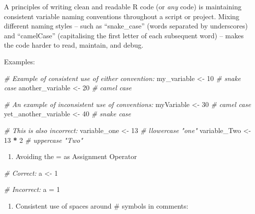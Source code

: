 \documentclass[
  10t,
]{article}
\newenvironment{Shaded}{\begin{snugshade}}{\end{snugshade}}
\newcommand{\CommentTok}[1]{\textcolor[rgb]{0.56,0.35,0.01}{\textit{#1}}}
\newcommand{\DecValTok}[1]{\textcolor[rgb]{0.00,0.00,0.81}{#1}}
\newcommand{\NormalTok}[1]{#1}
\newcommand{\OtherTok}[1]{\textcolor[rgb]{0.56,0.35,0.01}{#1}}
\newcommand{\SpecialCharTok}[1]{\textcolor[rgb]{0.81,0.36,0.00}{\textbf{#1}}}
\providecommand{\tightlist}{%
  \setlength{\itemsep}{0pt}\setlength{\parskip}{0pt}}\usepackage{longtable,booktabs,array}
\begin{document}
A principles of writing clean and readable R code (or \emph{any} code)
is maintaining consistent variable naming conventions throughout a
script or project. Mixing different naming styles -- such as
``snake\_case'' (words separated by underscores) and ``camelCase''
(capitalising the first letter of each subsequent word) -- makes the
code harder to read, maintain, and debug.

Examples:

\begin{Shaded}
\begin{Highlighting}[]
\CommentTok{\# Example of consistent use of either convention:}
\NormalTok{my\_variable }\OtherTok{\textless{}{-}} \DecValTok{10} \CommentTok{\# snake case}
\NormalTok{another\_variable }\OtherTok{\textless{}{-}} \DecValTok{20} \CommentTok{\# camel case}

\CommentTok{\# An example of inconsistent use of conventions:}
\NormalTok{myVariable }\OtherTok{\textless{}{-}} \DecValTok{30} \CommentTok{\# camel case}
\NormalTok{yet\_another\_variable }\OtherTok{\textless{}{-}} \DecValTok{40} \CommentTok{\# snake case}

\CommentTok{\# This is also incorrect:}
\NormalTok{variable\_one }\OtherTok{\textless{}{-}} \DecValTok{13} \CommentTok{\# llowercase "one"}
\NormalTok{variable\_Two }\OtherTok{\textless{}{-}} \DecValTok{13} \SpecialCharTok{*} \DecValTok{2} \CommentTok{\# uppercase "Two"}
\end{Highlighting}
\end{Shaded}

\begin{enumerate}
\def\labelenumi{\arabic{enumi}.}
\setcounter{enumi}{5}
\tightlist
\item
  Avoiding the = as Assignment Operator
\end{enumerate}

\begin{Shaded}
\begin{Highlighting}[]
\CommentTok{\# Correct:}
\NormalTok{a }\OtherTok{\textless{}{-}} \DecValTok{1}

\CommentTok{\# Incorrect:}
\NormalTok{a }\OtherTok{=} \DecValTok{1}
\end{Highlighting}
\end{Shaded}

\begin{enumerate}
\def\labelenumi{\arabic{enumi}.}
\setcounter{enumi}{6}
\tightlist
\item
  Consistent use of spaces around \# symbols in comments:
\end{enumerate}
\end{document}

